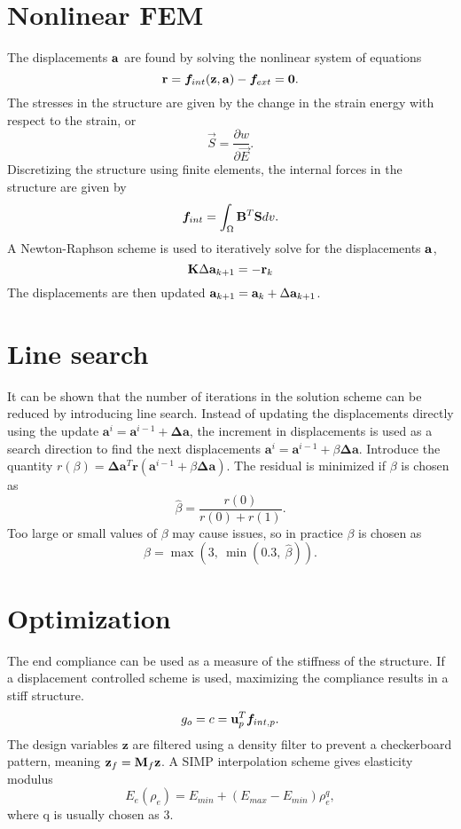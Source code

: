 \documentclass{article}
\begin{document}

\section{Nonlinear FEM}
The displacements $\mathbf{a}$ are found by solving the nonlinear system of equations
$$
\mathbf{r} = \boldsymbol{f}_{int}(\mathbf{z}, \mathbf{a}) - \boldsymbol{f}_{ext} = \mathbf{0}.
$$
The stresses in the structure are given by the change in the strain energy with respect to the strain, or
$$
\vec{S} = \frac{\partial w}{\partial \vec{E}}.
$$
Discretizing the structure using finite elements, the internal forces in the structure are given by
$$
\boldsymbol{f}_{int} = \int_\Omega \mathbf{B}^T \mathbf{S}dv.
$$
A Newton-Raphson scheme is used to iteratively solve for the displacements $\mathbf{a}$,
$$
\mathbf{K} \Delta \mathbf{a}_{k + 1}= -\mathbf{r}_{k}
$$
The displacements are then updated $\mathbf{a}_{k + 1} = \mathbf{a}_k + \Delta \mathbf{a}_{k + 1}$.

\section{Line search}
It can be shown that the number of iterations in the solution scheme can be reduced by introducing line search. Instead of updating the displacements directly using the update $\bm a^i = \bm a^{i - 1} + \bm \Delta \bm a$, the increment in displacements is used as a search direction to find the next displacements $\bm a^i = \bm a^{i - 1} + \beta \bm \Delta \bm a$. Introduce the quantity $r(\beta) = \bm \Delta \bm a^T\bm r(\bm a^{i - 1} + \beta\bm \Delta \bm a)$. The residual is minimized if $\beta$ is chosen as
$$
\hat{\beta} = \frac{r(0)}{r(0) + r(1)}.
$$
Too large or small values of $\beta$ may cause issues, so in practice $\beta$ is chosen as
$$
\beta = \max\left(3, \ \min\left(0.3, \ \hat{\beta}\right)\right).
$$

\section{Optimization}
The end compliance can be used as a measure of the stiffness of the structure. If a displacement controlled scheme is used, maximizing the compliance results in a stiff structure.
$$
g_o = c = \bm {\mathbf{u}}_p^T\boldsymbol{f}_{int, p}.
$$
The design variables $\bm z$ are filtered using a density filter to prevent a checkerboard pattern, meaning $\mathbf{z}_f = \mathbf{M}_f\mathbf{z}$.
A SIMP interpolation scheme gives elasticity modulus 
$$
E_e(\rho_e) = E_{min} + (E_{max} - E_{min})\rho_e^q,
$$
where q is usually chosen as 3.
\end{document}
